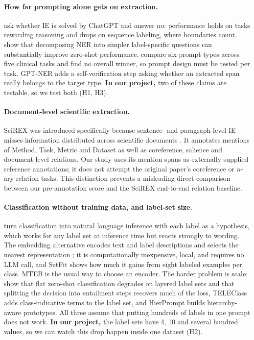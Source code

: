 \paragraph{How far prompting alone gets on extraction.}
\citet{han2023solved} ask whether IE is solved by ChatGPT and answer no:
performance holds on tasks rewarding reasoning and drops on sequence labeling,
where boundaries count. \citet{xie2023empirical} show that decomposing NER into
simpler label-specific questions can substantially improve zero-shot
performance. \citet{sivarajkumar2024empirical} compare six prompt types across five
clinical tasks and find no overall winner, so prompt design must be tested per
task. GPT-NER \citep{wang2023gptner} adds a self-verification step asking
whether an extracted span really belongs to the target type.
\textbf{In our project,} two of these claims are testable, so we test both
(H1, H3).

\paragraph{Document-level scientific extraction.}
SciREX was introduced specifically because sentence- and paragraph-level IE
misses information distributed across scientific documents
\citep{jain2020scirex}. It annotates mentions of Method, Task, Metric and
Dataset as well as coreference, salience and document-level relations. Our
study uses its mention spans as externally supplied reference annotations; it
does not attempt the original paper's coreference or $n$-ary relation tasks.
This distinction prevents a misleading direct comparison between our
pre-annotation score and the SciREX end-to-end relation baseline.

\paragraph{Classification without training data, and label-set size.}
\citet{yin2019benchmarking} turn classification into natural language inference
with each label as a hypothesis, which works for any label set at inference
time but reacts strongly to wording. The embedding alternative encodes text and
label descriptions and selects the nearest representation
\citep{reimers2019sentence}; it is computationally inexpensive, local, and
requires no LLM call, and SetFit \citep{tunstall2022efficient}
shows how much it gains from eight labeled examples per class. MTEB
\citep{muennighoff2023mteb} is the usual way to choose an encoder. The harder
problem is scale: \citet{bhambhoria2023simple} show that flat zero-shot
classification degrades on layered label sets and that splitting the
decision into entailment steps recovers much of the loss, TELEClass
\citep{zhang2025teleclass} adds class-indicative terms to the label set,
and HierPrompt \citep{zhang2025hierprompt} builds hierarchy-aware prototypes.
All three assume that putting hundreds of labels in one prompt does not work.
\textbf{In our project,} the label sets have 4, 10 and several hundred values,
so we can watch this drop happen inside one dataset (H2).

